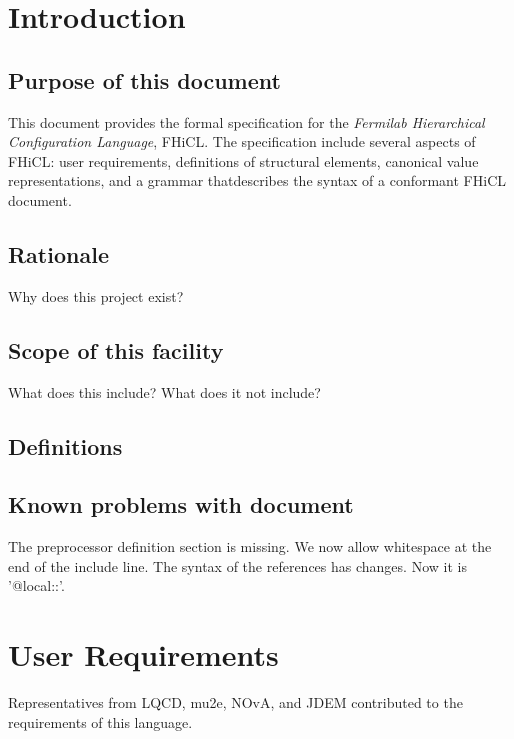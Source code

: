 \documentclass{memarticle}
\begin{document}
\topmatter
\chapter{Introduction}

\section{Purpose of this document}
This document provides the formal specification
for the \emph{Fermilab Hierarchical Configuration Language}, FHiCL.
The specification include several aspects of FHiCL:
user requirements, definitions of structural elements,
canonical value representations,
and a grammar thatdescribes the syntax of a conformant FHiCL document.

\section{Rationale}

\begin{fixme}
  Why does this project exist?
\end{fixme}

\section{Scope of this facility}

\begin{fixme}
  What does this include? What does it not include?
\end{fixme}

\section{Definitions}

\section{Known problems with document}

The preprocessor definition section is missing.  We now allow whitespace at the end of the include line.
The syntax of the references has changes.  Now it is '@local::'.

\chapter{User Requirements}

Representatives from LQCD, mu2e, NOvA, and JDEM contributed to the requirements 
of this language.
\end{document}
